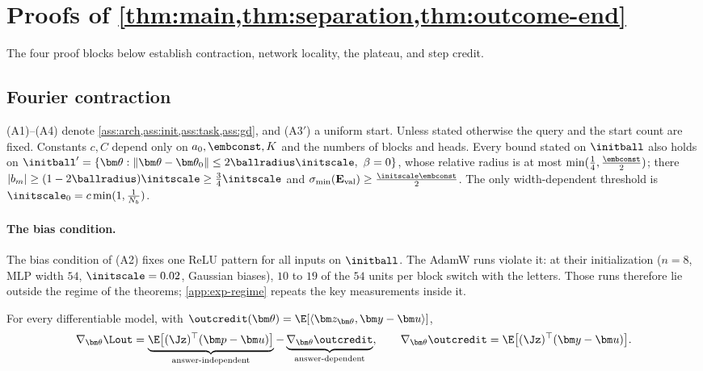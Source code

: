 \section{Proofs of \texorpdfstring{\cref{thm:main,thm:separation,thm:outcome-end}}{Lemmas 1-2 and Theorem 1(ii)}}
\label{app:damping-proof}
\label{app:mainproofs}
\label{app:credit-proof}

The four proof blocks below establish contraction, network locality, the plateau, and step credit.

\subsection{Fourier contraction}
\label{app:C-fourier}
\label{app:assumptions}




(A1)--(A4) denote \cref{ass:arch,ass:init,ass:task,ass:gd}, and (A3$'$) a uniform start. Unless stated otherwise the query and the start
count are fixed. Constants $c,C$ depend only on $a_0,\embconst,K$ and the numbers of blocks and heads. Every bound stated on $\initball$ also
holds on $\initball'=\{\bm\theta:\|\bm\theta-\bm\theta_0\|\le2\ballradius\initscale,\ \beta=0\}$, whose relative radius is at most $\min(\frac{1}{4},\frac{\embconst}{2})$; there
$|b_m|\ge(1-2\ballradius)\initscale\ge\frac{3}{4}\initscale$ and $\sigma_{\min}(\mathbf E_{\mathrm{val}})\ge\frac{\initscale\embconst}{2}$. The only width-dependent threshold is $\initscale_0=c\min(1,\frac{1}{N_b})$.

\paragraph{The bias condition.}\label{rem:two-block-bias} The bias condition of (A2) fixes one ReLU pattern for all inputs on $\initball$. The AdamW runs violate it: at their initialization
($n=8$, MLP width $54$, $\initscale=0.02$, Gaussian biases), $10$ to $19$ of the $54$ units per block switch with the letters. Those
runs therefore lie outside the regime of the theorems; \cref{app:exp-regime} repeats the key measurements inside it.


\begin{lemma}
\label{lem:gradient-split}
For every differentiable model, with $\outcredit(\bm\theta)=\E[\langle\bm z_{\bm\theta},\bm y-\bm u\rangle]$,
\[
 \nabla_{\bm\theta}\Lout=\underbrace{\E\bigl[(\Jz)^\top(\bm p-\bm u)\bigr]}_{\text{answer-independent}}-\underbrace{\nabla_{\bm\theta}\outcredit}_{\text{answer-dependent}},\qquad
 \nabla_{\bm\theta}\outcredit=\E\bigl[(\Jz)^\top(\bm y-\bm u)\bigr].
\]
\end{lemma}


